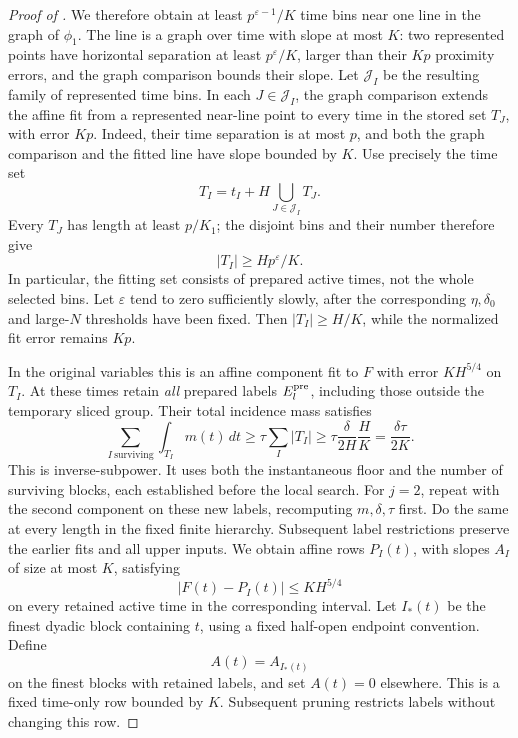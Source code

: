 \begin{proof}[Proof of ]
We therefore obtain at least \(p^{\varepsilon-1}/K\) time bins near one
line in the graph of \(\phi_1\).
The line is a graph over time with slope at most \(K\):
two represented points have horizontal separation at least
\(p^\varepsilon/K\), larger than their \(Kp\) proximity errors, and
the graph comparison bounds their slope.
Let \(\mathcal J_I\) be the resulting family of represented time
bins.  In each \(J\in\mathcal J_I\), the graph comparison extends the
affine fit from a represented near-line point to every time in the
stored set \(T_J\), with error \(Kp\).  Indeed, their time separation
is at most \(p\), and both the graph comparison and the fitted line
have slope bounded by \(K\).  Use precisely the time set
\[
 T_I=t_I+H\bigcup_{J\in\mathcal J_I}T_J.
\]
Every \(T_J\) has length at least \(p/K_1\); the disjoint bins and
their number therefore give
\[
 |T_I|\ge Hp^\varepsilon/K.
\]
In particular, the fitting set consists of prepared active times,
not the whole selected bins.
Let \(\varepsilon\) tend to zero sufficiently slowly, after the
corresponding \(\eta,\delta_0\) and large-\(N\) thresholds have been
fixed.  Then \(|T_I|\ge H/K\), while the normalized fit error remains
\(Kp\).

In the original variables this is an affine component fit to \(F\)
with error \(KH^{5/4}\) on \(T_I\).
At these times retain \emph{all} prepared labels \(E_l^{\rm pre}\),
including those outside the temporary sliced group.  Their total
incidence mass satisfies
\begin{equation}\label{a04:fit-mass-recovery}
 \sum_{I\ \mathrm{surviving}}\int_{T_I}m(t)\,dt
 \ge\tau\sum_I|T_I|
 \ge\tau\frac{\delta}{2H}\frac{H}{K}
 =\frac{\delta\tau}{2K}.
\end{equation}
This is inverse-subpower.  It uses both the instantaneous floor and
the number of surviving blocks, each established before the local
search.  For \(j=2\), repeat with the second component on these new
labels, recomputing \(m,\delta,\tau\) first.  Do the same at every
length in the fixed finite hierarchy.  Subsequent label restrictions
preserve the earlier fits and all upper inputs.  We obtain affine rows
\(P_I(t)\), with slopes
\(A_I\) of size at most \(K\), satisfying
\begin{equation}\label{a04:vector-affine-fit}
 |F(t)-P_I(t)|\le KH^{5/4}
\end{equation}
on every retained active time in the corresponding interval.
Let \(I_*(t)\) be the finest dyadic block containing \(t\), using a
fixed half-open endpoint convention.  Define
\[
 A(t)=A_{I_*(t)}
\]
on the finest blocks with retained labels, and set \(A(t)=0\)
elsewhere.  This is a fixed time-only row bounded by \(K\).
Subsequent pruning restricts labels without changing this row.


\end{proof}
